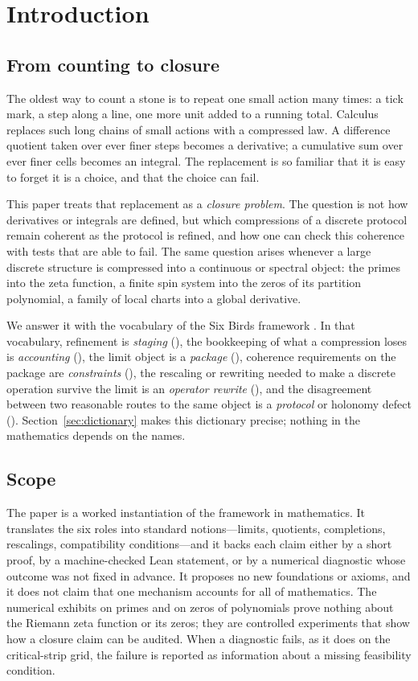 \section{Introduction}
\label{sec:introduction}

\subsection{From counting to closure}
The oldest way to count a stone is to repeat one small action many times: a tick mark, a step along a line, one more unit added to a running total.
Calculus replaces such long chains of small actions with a compressed law.
A difference quotient taken over ever finer steps becomes a derivative; a cumulative sum over ever finer cells becomes an integral.
The replacement is so familiar that it is easy to forget it is a choice, and that the choice can fail.

This paper treats that replacement as a \emph{closure problem}.
The question is not how derivatives or integrals are defined, but which compressions of a discrete protocol remain coherent as the protocol is refined, and how one can check this coherence with tests that are able to fail.
The same question arises whenever a large discrete structure is compressed into a continuous or spectral object: the primes into the zeta function, a finite spin system into the zeros of its partition polynomial, a family of local charts into a global derivative.

We answer it with the vocabulary of the Six Birds framework \cite{SixBirdsFramework}.
In that vocabulary, refinement is \emph{staging} (\Pfour), the bookkeeping of what a compression loses is \emph{accounting} (\Psix), the limit object is a \emph{package} (\Pfive), coherence requirements on the package are \emph{constraints} (\Ptwo), the rescaling or rewriting needed to make a discrete operation survive the limit is an \emph{operator rewrite} (\Pone), and the disagreement between two reasonable routes to the same object is a \emph{protocol} or holonomy defect (\Pthree).
Section~\ref{sec:dictionary} makes this dictionary precise; nothing in the mathematics depends on the names.

\subsection{Scope}
The paper is a worked instantiation of the framework in mathematics.
It translates the six roles into standard notions---limits, quotients, completions, rescalings, compatibility conditions---and it backs each claim either by a short proof, by a machine-checked Lean statement, or by a numerical diagnostic whose outcome was not fixed in advance.
It proposes no new foundations or axioms, and it does not claim that one mechanism accounts for all of mathematics.
The numerical exhibits on primes and on zeros of polynomials prove nothing about the Riemann zeta function or its zeros; they are controlled experiments that show how a closure claim can be audited.
When a diagnostic fails, as it does on the critical-strip grid, the failure is reported as information about a missing feasibility condition.


